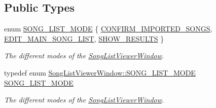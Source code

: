 \subsection*{Public Types}
\begin{DoxyCompactItemize}
\item 
enum \mbox{\hyperlink{class_song_list_viewer_window_a6f23a68c416173f6b571a2cc4990a927}{S\+O\+N\+G\+\_\+\+L\+I\+S\+T\+\_\+\+M\+O\+DE}} \{ \mbox{\hyperlink{class_song_list_viewer_window_a6f23a68c416173f6b571a2cc4990a927a9847037eeae7688b9cddf8700d425332}{C\+O\+N\+F\+I\+R\+M\+\_\+\+I\+M\+P\+O\+R\+T\+E\+D\+\_\+\+S\+O\+N\+GS}}, 
\mbox{\hyperlink{class_song_list_viewer_window_a6f23a68c416173f6b571a2cc4990a927ad119fc74405f78aff7ed2efda3eb7b74}{E\+D\+I\+T\+\_\+\+M\+A\+I\+N\+\_\+\+S\+O\+N\+G\+\_\+\+L\+I\+ST}}, 
\mbox{\hyperlink{class_song_list_viewer_window_a6f23a68c416173f6b571a2cc4990a927a7fbcaf0d5c1145332e50928f877040b4}{S\+H\+O\+W\+\_\+\+R\+E\+S\+U\+L\+TS}}
 \}
\begin{DoxyCompactList}\small\item\em The different modes of the \mbox{\hyperlink{class_song_list_viewer_window}{Song\+List\+Viewer\+Window}}. \end{DoxyCompactList}\item 
typedef enum \mbox{\hyperlink{class_song_list_viewer_window_a6f23a68c416173f6b571a2cc4990a927}{Song\+List\+Viewer\+Window\+::\+S\+O\+N\+G\+\_\+\+L\+I\+S\+T\+\_\+\+M\+O\+DE}} \mbox{\hyperlink{class_song_list_viewer_window_a2942818cc26b8ff9e29827f97356ac9c}{S\+O\+N\+G\+\_\+\+L\+I\+S\+T\+\_\+\+M\+O\+DE}}
\begin{DoxyCompactList}\small\item\em The different modes of the \mbox{\hyperlink{class_song_list_viewer_window}{Song\+List\+Viewer\+Window}}. \end{DoxyCompactList}\end{DoxyCompactItemize}
